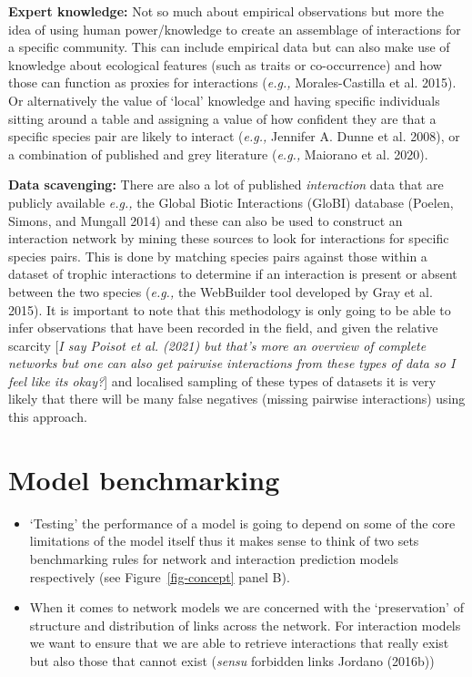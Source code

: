 \documentclass[
  letterpaper,
  DIV=11,
  numbers=noendperiod]{scrartcl}
\begin{document}
\textbf{Expert knowledge:} Not so much about empirical observations but
more the idea of using human power/knowledge to create an assemblage of
interactions for a specific community. This can include empirical data
but can also make use of knowledge about ecological features (such as
traits or co-occurrence) and how those can function as proxies for
interactions (\emph{e.g.,} Morales-Castilla et al. 2015). Or
alternatively the value of `local' knowledge and having specific
individuals sitting around a table and assigning a value of how
confident they are that a specific species pair are likely to interact
(\emph{e.g.,} Jennifer A. Dunne et al. 2008), or a combination of
published and grey literature (\emph{e.g.,} Maiorano et al. 2020).

\textbf{Data scavenging:} There are also a lot of published
\emph{interaction} data that are publicly available \emph{e.g.,} the
Global Biotic Interactions (GloBI) database (Poelen, Simons, and Mungall
2014) and these can also be used to construct an interaction network by
mining these sources to look for interactions for specific species
pairs. This is done by matching species pairs against those within a
dataset of trophic interactions to determine if an interaction is
present or absent between the two species (\emph{e.g.,} the WebBuilder
tool developed by Gray et al. 2015). It is important to note that this
methodology is only going to be able to infer observations that have
been recorded in the field, and given the relative scarcity {[}\emph{I
say Poisot et al. (2021) but that's more an overview of complete
networks but one can also get pairwise interactions from these types of
data so I feel like its okay?}{]} and localised sampling of these types
of datasets it is very likely that there will be many false negatives
(missing pairwise interactions) using this approach.

\section{Model benchmarking}\label{model-benchmarking}

\begin{itemize}
\item
  `Testing' the performance of a model is going to depend on some of the
  core limitations of the model itself thus it makes sense to think of
  two sets benchmarking rules for network and interaction prediction
  models respectively (see Figure~\ref{fig-concept} panel B).
\item
  When it comes to network models we are concerned with the
  `preservation' of structure and distribution of links across the
  network. For interaction models we want to ensure that we are able to
  retrieve interactions that really exist but also those that cannot
  exist (\emph{sensu} forbidden links Jordano (2016b))
\end{itemize}
\end{document}
